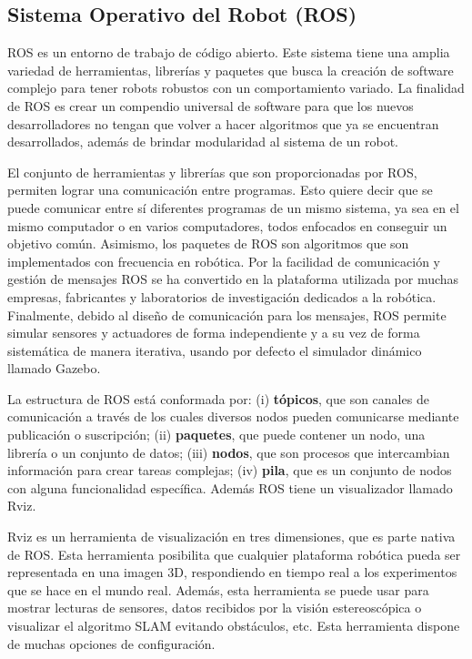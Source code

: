\subsection{Sistema Operativo del Robot (ROS)}
ROS es un entorno de trabajo de código abierto. Este sistema tiene una amplia variedad de herramientas, librerías y paquetes que busca 
la creación de software complejo para tener robots robustos con un comportamiento 
variado. La finalidad de ROS es crear un compendio universal de 
software para que los nuevos desarrolladores no tengan que volver a hacer algoritmos 
que ya se encuentran desarrollados, además de brindar modularidad al sistema de un robot.

El conjunto de herramientas y librerías que son proporcionadas por ROS, permiten 
lograr una comunicación entre programas. Esto quiere decir que se puede comunicar 
entre sí diferentes programas de un mismo sistema, ya sea en el mismo computador 
o en varios computadores, todos enfocados en conseguir un objetivo común. 
Asimismo, los paquetes de ROS son algoritmos que son implementados con 
frecuencia en robótica. Por la facilidad de comunicación y gestión de mensajes 
ROS se ha convertido en la plataforma utilizada por muchas empresas, fabricantes y 
laboratorios de investigación dedicados a la robótica. Finalmente, debido al diseño 
de comunicación para los mensajes, ROS permite simular sensores y actuadores de forma 
independiente y a su vez de forma sistemática de manera iterativa, usando por defecto 
el simulador dinámico llamado Gazebo.

La estructura de ROS está conformada por: 
(i) \textbf{tópicos}, que son canales de comunicación a través de los cuales diversos 
nodos pueden comunicarse mediante publicación o suscripción; (ii) \textbf{paquetes}, que 
puede contener un nodo, una librería o un conjunto de datos; (iii) \textbf{nodos}, que 
son procesos que intercambian información para crear tareas complejas; (iv) \textbf{pila}, 
que es un conjunto de nodos con alguna funcionalidad específica. Además ROS tiene un 
visualizador llamado Rviz.

Rviz es un herramienta de visualización en tres dimensiones, que es parte nativa de 
ROS. Esta herramienta posibilita que cualquier plataforma robótica pueda ser 
representada en una imagen 3D, respondiendo en tiempo real a los experimentos que se 
hace en el mundo real. Además, esta herramienta se puede usar para mostrar lecturas 
de sensores, datos recibidos por la visión estereoscópica o visualizar el algoritmo 
SLAM evitando obstáculos, etc. Esta herramienta dispone de muchas opciones de 
configuración.

